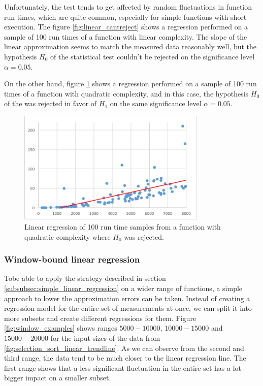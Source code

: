 Unfortunately, the test tends to get affected by random fluctuations in function run times, which are quite common, especially for simple functions with short execution. The figure \ref{fig:linear_cantreject} shows a regression performed on a sample of 100 run times of a function with linear complexity. The slope of the linear approximation seems to match the measured data reasonably well, but the hypothesis $H_0$ of the statistical test couldn't be rejected on the significance level $\alpha = 0.05$. 

On the other hand, figure \ref{fig:quadratic_rejected} shows a regression performed on a sample of 100 run times of a function with quadratic complexity, and in this case, the hypothesis $H_0$ of the was rejected in favor of $H_1$ on the same significance level $\alpha = 0.05$.

\begin{figure}[h!]
	\centerline{\mbox{\includegraphics[width=90mm]{./img/quadratic_rejected.png}}}
	\caption{Linear regression of 100 run time samples from a function with quadratic complexity where $H_0$ was rejected.}
	\label{fig:quadratic_rejected}
\end{figure}

\subsubsection{Window-bound linear regression}
\label{subsubsec:window_bound_regression}

Tobe able to apply the strategy described in section \ref{subsubsec:simple_linear_regression} on a wider range of functions, a simple approach to lower the approximation errors can be taken. Instead of creating a regression model for the entire set of measurements at once, we can split it into more subsets and create different regressions for them. Figure \ref{fig:window_examples} shows ranges $5000 - 10000$, $10000-15000$ and $15000-20000$ for the input sizes of the data from \ref{fig:selection_sort_linear_trendline}. As we can observe from the second and third range, the data tend to be much closer to the linear regression line. The first range shows that a less significant fluctuation in the entire set has a lot bigger impact on a smaller subset.

